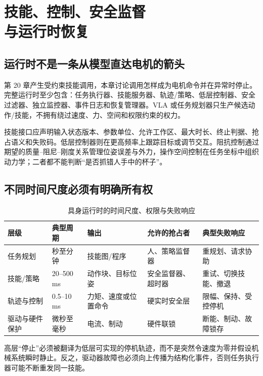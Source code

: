 \chapter[技能、控制、安全监督与运行时恢复]{技能、控制、安全监督\\与运行时恢复}
\label{chap:runtime-recovery}

\section{运行时不是一条从模型直达电机的箭头}

第 20 章产生受约束技能调用，本章讨论调用怎样成为电机命令并在异常时停止。完整运行时至少包含：任务执行器、技能服务器、轨迹/策略、低层控制器、安全过滤器、独立监控器、事件日志和恢复管理器。VLA 或任务规划器只生产候选动作/技能，不拥有绕过速度、力、空间和权限约束的权力。

技能接口应声明输入状态版本、参数单位、允许工作区、最大时长、终止判据、抢占语义和失败码。低层控制器则在更高频率上跟踪目标或调节交互。阻抗控制通过期望的质量--阻尼--刚度关系管理位姿误差与外力\cite{hogan1985impedance}，操作空间控制在任务坐标中组织动力学\cite{khatib1987operational}；二者都不能判断“是否抓错人手中的杯子”。

\section{不同时间尺度必须有明确所有权}

\begin{table}[H]
\centering
\caption{具身运行时的时间尺度、权限与失败响应}
\label{tab:runtime-timescales}
\begin{tabularx}{\textwidth}{p{}YYYY}
\toprule
层级 & 典型周期 & 输出 & 允许的抢占者 & 典型失败响应 \\
\midrule
任务规划 & 秒至分钟 & 技能图/程序 & 人、策略监督器 & 重规划、请求协助 \\
技能/策略 & 20--500 ms & 动作块、目标位姿 & 安全监督器、超时器 & 重试、切换技能、撤退 \\
轨迹与控制 & 0.5--10 ms & 力矩、速度或位置命令 & 硬实时安全层 & 限幅、保持、受控停机 \\
驱动与硬件保护 & 微秒至毫秒 & 电流、制动 & 硬件联锁 & 断能、制动、故障锁存 \\
\bottomrule
\end{tabularx}
\end{table}

高层“停止”必须被翻译为低层可实现的停机轨迹，而不是突然令速度为零并假设机械系统瞬时静止。反之，驱动器故障也必须向上传播为结构化事件，否则任务执行器可能不断重发同一技能。

